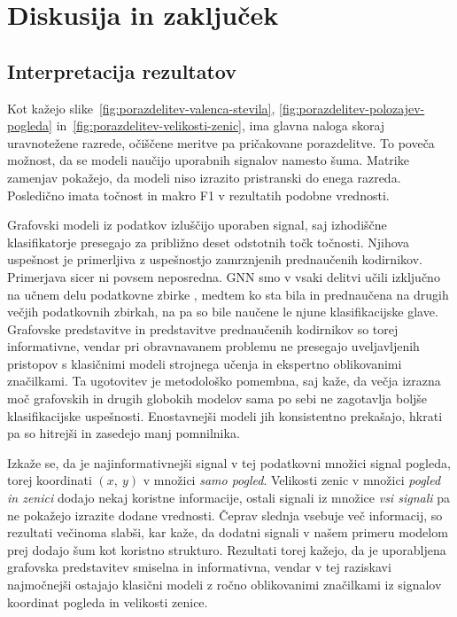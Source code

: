 \chapter{Diskusija in zaključek}
\label{sec:diskusija}
\label{sec:zakljucek}

\section{Interpretacija rezultatov}

Kot kažejo slike~\ref{fig:porazdelitev-valenca-stevila}, \ref{fig:porazdelitev-polozajev-pogleda} in~\ref{fig:porazdelitev-velikosti-zenic}, ima glavna naloga skoraj uravnotežene razrede, očiščene meritve pa pričakovane porazdelitve.
To poveča možnost, da se modeli naučijo uporabnih signalov namesto šuma.
Matrike zamenjav pokažejo, da modeli niso izrazito pristranski do enega razreda.
Posledično imata točnost in makro F1 v rezultatih podobne vrednosti.

Grafovski modeli iz podatkov izluščijo uporaben signal, saj izhodiščne klasifikatorje presegajo za približno deset odstotnih točk točnosti.
Njihova uspešnost je primerljiva z uspešnostjo zamrznjenih prednaučenih kodirnikov.
Primerjava sicer ni povsem neposredna.
GNN smo v vsaki delitvi učili izključno na učnem delu podatkovne zbirke \MAHNOB{}, medtem ko sta bila  in  prednaučena na drugih večjih podatkovnih zbirkah, na \MAHNOB{} pa so bile naučene le njune klasifikacijske glave.
Grafovske predstavitve in predstavitve prednaučenih kodirnikov so torej informativne, vendar pri obravnavanem problemu ne presegajo uveljavljenih pristopov s klasičnimi modeli strojnega učenja in ekspertno oblikovanimi značilkami.
Ta ugotovitev je metodološko pomembna, saj kaže, da večja izrazna moč grafovskih in drugih globokih modelov sama po sebi ne zagotavlja boljše klasifikacijske uspešnosti.
Enostavnejši modeli jih konsistentno prekašajo, hkrati pa so hitrejši in zasedejo manj pomnilnika.

Izkaže se, da je najinformativnejši signal v tej podatkovni množici signal pogleda, torej koordinati $(x,~y)$ v množici \emph{samo pogled}.
Velikosti zenic v množici \emph{pogled in zenici} dodajo nekaj koristne informacije, ostali signali iz množice \emph{vsi signali} pa ne pokažejo izrazite dodane vrednosti.
Čeprav slednja vsebuje več informacij, so rezultati večinoma slabši, kar kaže, da dodatni signali v našem primeru modelom prej dodajo šum kot koristno strukturo.
Rezultati torej kažejo, da je uporabljena grafovska predstavitev smiselna in informativna, vendar v tej raziskavi najmočnejši ostajajo klasični modeli z ročno oblikovanimi značilkami iz signalov koordinat pogleda in velikosti zenice.

